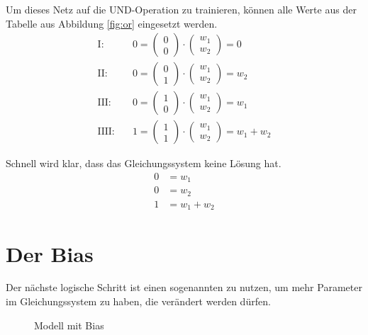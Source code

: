 \documentclass[a4paper]{report}
\begin{document}
Um dieses Netz auf die UND-Operation zu trainieren, können alle Werte aus der Tabelle aus Abbildung \ref{fig:or} eingesetzt werden.
\begin{align}
    \text{I:}&\quad 0=\begin{pmatrix}
        0 \\
        0
    \end{pmatrix}\cdot
    \begin{pmatrix}
        w_1 \\
        w_2
    \end{pmatrix}=0 \\
    \text{II:}&\quad 0=\begin{pmatrix}
        0 \\
        1
    \end{pmatrix}\cdot
    \begin{pmatrix}
        w_1 \\
        w_2
    \end{pmatrix}=w_2 \\
    \text{III:}&\quad 0=\begin{pmatrix}
        1 \\
        0
    \end{pmatrix}\cdot
    \begin{pmatrix}
        w_1 \\
        w_2
    \end{pmatrix}=w_1 \\
    \text{IIII:}&\quad 1=\begin{pmatrix}
        1 \\
        1
    \end{pmatrix}\cdot
    \begin{pmatrix}
        w_1 \\
        w_2
    \end{pmatrix}=w_1+w_2
\end{align}

Schnell wird klar, dass das Gleichungssystem keine Lösung hat.
\begin{align}
    0&=w_1 \\
    0&=w_2 \\
    1&=w_1+w_2
\end{align}

\section{Der Bias}
Der nächste logische Schritt ist einen sogenannten  zu nutzen, um mehr Parameter im Gleichungssystem zu haben, die verändert werden dürfen.
\begin{figure}[ht]
    \centering
    \caption{Modell mit Bias}
    \label{fig:net1}
\end{figure}
\end{document}
